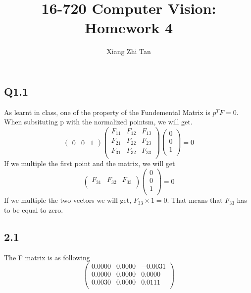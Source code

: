 \documentclass{article}
\begin{document}
\title{16-720 Computer Vision: Homework 4}
\author{Xiang Zhi Tan}

\maketitle
\subsection*{Q1.1}
As learnt in class, one of the property of the Fundemental Matrix is $p^TF = 0$. When subsituting p with the normalized pointsm, we will get.
\begin{equation*}
\begin{pmatrix}
0 & 0 & 1
\end{pmatrix}
\begin{pmatrix}
F_{11}&F_{12}&F_{13}\\
F_{21}&F_{22}&F_{23}\\
F_{31}&F_{32}&F_{33}\\
\end{pmatrix}
\begin{pmatrix}
0\\
0\\
1\\
\end{pmatrix}
= 0
\end{equation*}
If we multiple the first point and the matrix, we will get
\begin{equation*}
\begin{pmatrix}
F_{31}&F_{32}&F_{33}\\
\end{pmatrix}
\begin{pmatrix}
0\\
0\\
1\\
\end{pmatrix}
= 0
\end{equation*}
If we multiple the two vectors we will get, $F_{33} \times 1 = 0$. That means that $F_{33}$ has to be equal to zero.

\subsection*{2.1}
The F matrix is as following
\begin{equation*}
\begin{pmatrix}
    0.0000  &  0.0000   &-0.0031\\
    0.0000  &  0.0000   & 0.0000\\
    0.0030  &  0.0000   & 0.0111\\
\end{pmatrix}
\end{equation*}
\end{document}
